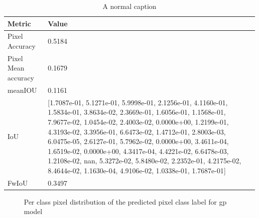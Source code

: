     \begin{table}
	\begin{center}
		\begin{tabular}{ | l | p{12cm} |}
			\hline
			
			\cellcolor{purple!30}Metric & \cellcolor{purple!30}Value \\ \hline
			Pixel Accuracy & 0.5184 \\ \hline
			Pixel Mean accuracy & 0.1679  \\ \hline
			meanIOU & 0.1161 \\ \hline
			IoU & [1.7087e-01, 5.1271e-01, 5.9998e-01, 2.1256e-01, 4.1160e-01, 1.5834e-01,
			3.8634e-02, 2.3669e-01, 1.6056e-01, 1.1568e-01, 7.9677e-02, 1.0454e-02,
			2.4003e-02, 0.0000e+00, 1.2199e-01, 4.3193e-02, 3.3956e-01, 6.6473e-02,
			1.4712e-01, 2.8003e-03, 6.0475e-05, 2.6127e-01, 5.7962e-02, 0.0000e+00,
			3.4611e-04, 1.6519e-02, 0.0000e+00, 4.3417e-04, 4.4221e-02, 6.6478e-03,
			1.2108e-02,        nan, 5.3272e-02, 5.8480e-02, 2.2352e-01, 4.2175e-02,
			8.4644e-02, 1.1630e-04, 4.9106e-02, 1.0338e-01, 1.7687e-01] \\ \hline
			FwIoU & 0.3497 \\ \hline
			\hline
		\end{tabular}
		\caption{A normal caption}
		\label{tab:caption}
	\end{center}
	\end{table}
	
	\begin{figure}%
		\centering
		\qquad
		\caption{Per class pixel distribution of the predicted pixel class label for gp model}%
		\label{fig:y_gt_and_predic_gp}%
	\end{figure}

